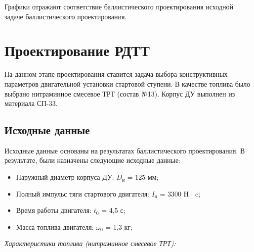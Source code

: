 Графики отражают соответствие баллистического проектирования исходной задаче баллистического проектирования.

\clearpage
\section{Проектирование РДТТ}
На данном этапе проектирования ставится задача выбора конструктивных параметров двигательной установки стартовой ступени. В качестве топлива было выбрано нитраминное смесевое ТРТ (состав №13). Корпус ДУ выполнен из материала СП-33.

\subsection{Исходные данные}
Исходные данные основаны на результатах баллистического проектирования. В результате, были назначены следующие исходные данные:
\begin{itemize}
	\item Наружный диаметр корпуса ДУ:				$D_\text{н}$ = 125 мм;
	\item Полный импульс тяги стартового двигателя: $I_\text{п}$ = 3300 Н $\cdot$ c;
	\item Время работы двигателя:					$t_0$ = 4,5 с;
	\item Масса топлива двигателя:					$\omega_0$ = 1,3 кг;
\end{itemize}

\emph{Характеристики топлива (нитраминное смесевое ТРТ):}

